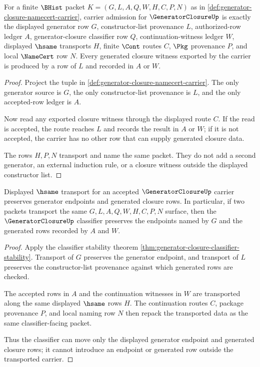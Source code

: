 \begin{theorem}
\label{thm:generatorclosure-carrier-obligation}
For a finite $\BHist$ packet $K=(G,L,A,Q,W,H,C,P,N)$ as in \autoref{def:generator-closure-namecert-carrier}, carrier admission for $\GeneratorClosureUp$ is exactly the displayed generator row $G$, constructor-list provenance $L$, authorized-row ledger $A$, generator-closure classifier row $Q$, continuation-witness ledger $W$, displayed $\hsame$ transports $H$, finite $\Cont$ routes $C$, $\Pkg$ provenance $P$, and local $\NameCert$ row $N$. Every generated closure witness exported by the carrier is produced by a row of $L$ and recorded in $A$ or $W$.
\end{theorem}
\begin{proof}
Project the tuple in \autoref{def:generator-closure-namecert-carrier}. The only generator source is $G$, the only constructor-list provenance is $L$, and the only accepted-row ledger is $A$.

Now read any exported closure witness through the displayed route $C$. If the read is accepted, the route reaches $L$ and records the result in $A$ or $W$; if it is not accepted, the carrier has no other row that can supply generated closure data.

The rows $H,P,N$ transport and name the same packet. They do not add a second generator, an external induction rule, or a closure witness outside the displayed constructor list.
\end{proof}

\begin{theorem}
\label{thm:generatorclosure-classifier-obligation}
Displayed $\hsame$ transport for an accepted $\GeneratorClosureUp$ carrier preserves generator endpoints and generated closure rows. In particular, if two packets transport the same $G,L,A,Q,W,H,C,P,N$ surface, then the $\GeneratorClosureUp$ classifier preserves the endpoints named by $G$ and the generated rows recorded by $A$ and $W$.
\end{theorem}
\begin{proof}
Apply the classifier stability theorem \autoref{thm:generator-closure-classifier-stability}. Transport of $G$ preserves the generator endpoint, and transport of $L$ preserves the constructor-list provenance against which generated rows are checked.

The accepted rows in $A$ and the continuation witnesses in $W$ are transported along the same displayed $\hsame$ rows $H$. The continuation routes $C$, package provenance $P$, and local naming row $N$ then repack the transported data as the same classifier-facing packet.

Thus the classifier can move only the displayed generator endpoint and generated closure rows; it cannot introduce an endpoint or generated row outside the transported carrier.
\end{proof}

